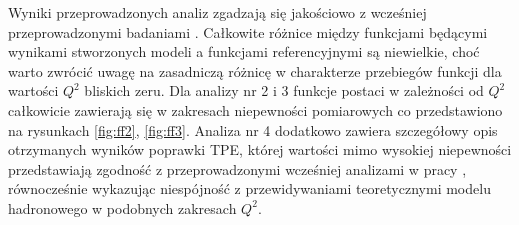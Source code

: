 \documentclass[11pt]{book}
\theoremstyle{definition}
\begin{document}
Wyniki przeprowadzonych analiz zgadzają się jakościowo z wcześniej przeprowadzonymi badaniami \cite{2009PhRvC..79f5204A}. Całkowite różnice między funkcjami będącymi wynikami stworzonych modeli a funkcjami referencyjnymi są niewielkie, choć warto zwrócić uwagę na zasadniczą różnicę w charakterze przebiegów funkcji dla wartości $Q^2$ bliskich zeru. Dla analizy nr 2 i 3 funkcje postaci w zależności od $Q^2$ całkowicie zawierają się w zakresach niepewności pomiarowych co przedstawiono na rysunkach \ref{fig:ff2}, \ref{fig:ff3}. Analiza nr 4 dodatkowo zawiera szczegółowy opis otrzymanych wyników poprawki TPE, której wartości mimo wysokiej niepewności przedstawiają zgodność z przeprowadzonymi wcześniej analizami w pracy \cite{2013PhRvC..88f5205G}, równocześnie wykazując niespójność z przewidywaniami teoretycznymi modelu hadronowego w podobnych zakresach $Q^2$.






\clearpage

\appendix
\setcounter{secnumdepth}{-1}
\end{document}

